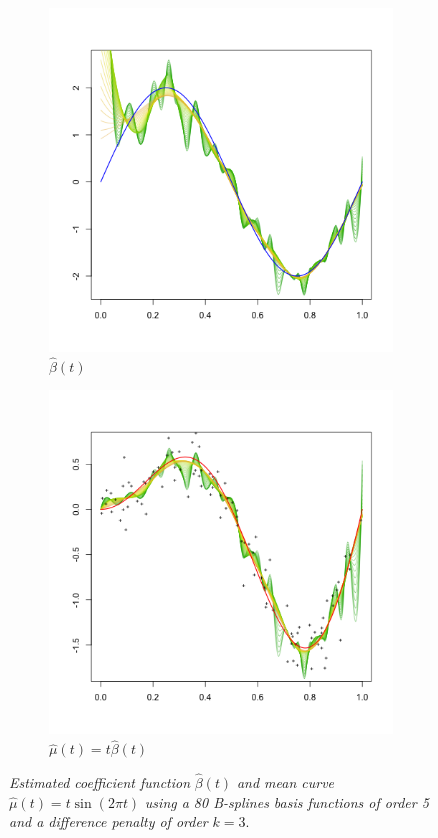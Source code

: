 \documentclass[12pt]{article}
\begin{document}
\begin{figure}[H]
 \begin{subfigure}{.48\textwidth}
  \centering
   \graphicspath{{img/}}
 \includegraphics[scale=0.5]{PS_VCM_section_figure_2.png}
 \caption{$\hat{\beta}\left(t\right)$}
 \end{subfigure}
 \begin{subfigure}{.48\textwidth}
  \centering
   \graphicspath{{img/}}
  \includegraphics[scale=0.5]{PS_VCM_section_figure_3.png}
 \caption{$\hat{\mu}\left(t\right) = t \hat{\beta}\left(t\right)$}
\label{fig:PS_VCM_section_figure_2}
 \end{subfigure}
 \caption{\textit{Estimated coefficient function} $\hat{\beta}\left(t\right)$ \textit{and mean curve} $\hat{\mu}\left(t\right) = t \sin(2 \pi t)$ \textit{using a 80 B-splines basis functions of order 5 and a difference penalty of order} $k=3$.}
\end{figure}
\end{document}
